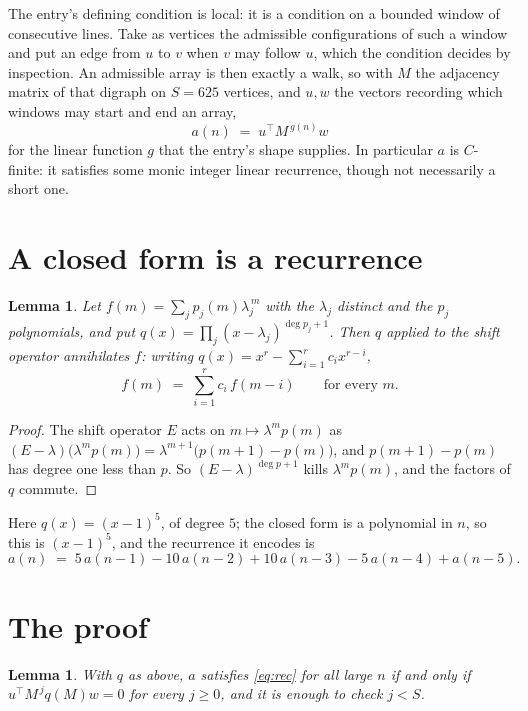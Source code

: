 \documentclass[11pt,a4paper]{article}
\theoremstyle{plain}
\newtheorem{lemma}[theorem]{Lemma}
\theoremstyle{definition}
\begin{document}
The entry's defining condition is local: it is a condition on a bounded window of consecutive lines. Take as vertices the
admissible configurations of such a window and put an edge from $u$ to $v$ when $v$ may
follow $u$, which the condition decides by inspection. An admissible array is then exactly a
walk, so with $M$ the adjacency matrix of that digraph on $S=625$ vertices, and $u,w$ the
vectors recording which windows may start and end an array,
\[
a(n)\;=\;u^{\!\top}M^{\,g(n)}w
\]
for the linear function $g$ that the entry's shape supplies. In particular $a$ is
$C$-finite: it satisfies some monic integer linear recurrence, though not necessarily a short
one.

\section{A closed form is a recurrence}

\begin{lemma}\label{lem:ann}
Let $f(m)=\sum_{j}p_j(m)\lambda_j^{\,m}$ with the $\lambda_j$ distinct and the $p_j$
polynomials, and put $q(x)=\prod_j(x-\lambda_j)^{\deg p_j+1}$. Then $q$ applied to the shift
operator annihilates $f$: writing $q(x)=x^{r}-\sum_{i=1}^{r}c_ix^{r-i}$,
\[
f(m)\;=\;\sum_{i=1}^{r}c_i\,f(m-i)\qquad\text{for every }m.
\]
\end{lemma}

\begin{proof}
The shift operator $E$ acts on $m\mapsto\lambda^{m}p(m)$ as
$(E-\lambda)\bigl(\lambda^{m}p(m)\bigr)=\lambda^{m+1}\bigl(p(m+1)-p(m)\bigr)$, and
$p(m+1)-p(m)$ has degree one less than $p$. So $(E-\lambda)^{\deg p+1}$ kills
$\lambda^{m}p(m)$, and the factors of $q$ commute.
\end{proof}

Here $q(x)=(x-1)^{5}$, of degree $5$; the closed form is a polynomial in $n$, so this is $(x-1)^{5}$, and the recurrence it encodes is
\begin{equation}\label{eq:rec}
a(n)\;=\;5\,a(n-1) - 10\,a(n-2) + 10\,a(n-3) - 5\,a(n-4) + a(n-5).
\end{equation}

\section{The proof}

\begin{lemma}\label{lem:crit}
With $q$ as above, $a$ satisfies \eqref{eq:rec} for all large $n$ if and only if
$u^{\!\top}M^{\,j}q(M)w=0$ for every $j\ge0$, and it is enough to check $j<S$.
\end{lemma}
\end{document}
